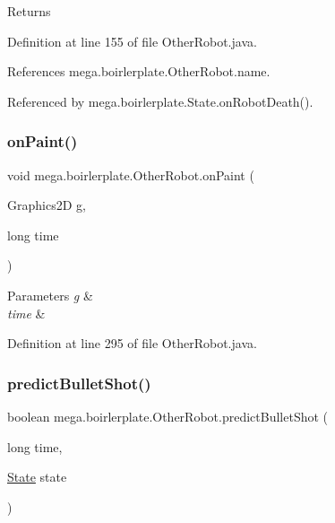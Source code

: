 \begin{DoxyReturn}{Returns}

\end{DoxyReturn}


Definition at line 155 of file Other\+Robot.\+java.



References mega.\+boirlerplate.\+Other\+Robot.\+name.



Referenced by mega.\+boirlerplate.\+State.\+on\+Robot\+Death().

\mbox{\label{classmega_1_1boirlerplate_1_1_other_robot_a483011f9f4a11f78ee29e26b29e9d377}} 
\subsubsection{\texorpdfstring{on\+Paint()}{onPaint()}}
{\footnotesize\ttfamily void mega.\+boirlerplate.\+Other\+Robot.\+on\+Paint (\begin{DoxyParamCaption}\item[{Graphics2D}]{g,  }\item[{long}]{time }\end{DoxyParamCaption})}


\begin{DoxyParams}{Parameters}
{\em g} & \\
\hline
{\em time} & \\
\hline
\end{DoxyParams}


Definition at line 295 of file Other\+Robot.\+java.

\mbox{\label{classmega_1_1boirlerplate_1_1_other_robot_a41146518d02943fb92e8b469d4d070ca}} 
\subsubsection{\texorpdfstring{predict\+Bullet\+Shot()}{predictBulletShot()}}
{\footnotesize\ttfamily boolean mega.\+boirlerplate.\+Other\+Robot.\+predict\+Bullet\+Shot (\begin{DoxyParamCaption}\item[{long}]{time,  }\item[{\hyperlink{classmega_1_1boirlerplate_1_1_state}{State}}]{state }\end{DoxyParamCaption})}


